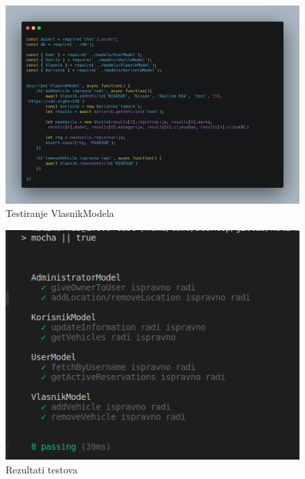			
			\begin{figure}[hp]
                    \centering
                    \includegraphics[width=15cm]{dokumentacija/slike/VlasnikModel.png}
                    \caption{Testiranje VlasnikModela}
                    \label{fig:useCase-2}
                \end{figure}
			\eject 
			
			\begin{figure}[hp]
                    \centering
                    \includegraphics[width=15cm]{dokumentacija/slike/rjesenjeeeee.png}
                    \caption{Rezultati testova}
                    \label{fig:useCase-2}
                \end{figure}
			\eject 
			
